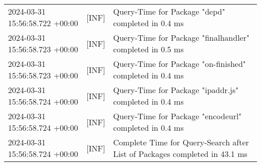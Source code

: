 {{\begin{tabularx}{\textwidth}{|l|l|X|}
                    2024-03-31 15:56:58.722 +00:00 & [INF] & Query-Time for Package "depd" completed in 0.4 ms \\
                    2024-03-31 15:56:58.723 +00:00 & [INF] & Query-Time for Package "finalhandler" completed in 0.5 ms \\
                    2024-03-31 15:56:58.723 +00:00 & [INF] & Query-Time for Package "on-finished" completed in 0.4 ms \\
                    2024-03-31 15:56:58.724 +00:00 & [INF] & Query-Time for Package "ipaddr.js" completed in 0.4 ms \\
                    2024-03-31 15:56:58.724 +00:00 & [INF] & Query-Time for Package "encodeurl" completed in 0.4 ms \\
                    2024-03-31 15:56:58.724 +00:00 & [INF] & Complete Time for Query-Search after List of Packages completed in 43.1 ms \\
                    \hline
                \end{tabularx}
            }
        }


